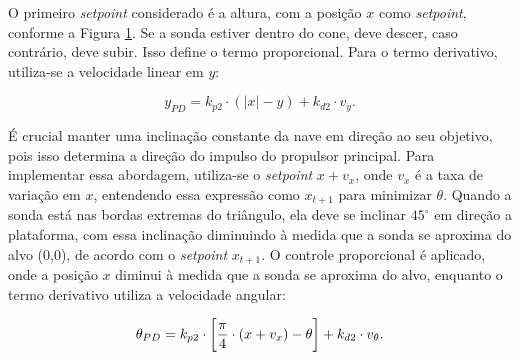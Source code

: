 \documentclass[12pt,           %
a4paper,                       %
openany,                       %
oneside,                       %
chapter=TITLE,                 %
english,                       %
spanish,                       %
brazil,                        %
sumario=tradicional]{abntex2}  %
\begin{document}
\begin{OnehalfSpace}
\begin{figure}[H]
    \label{fig:aa}
\end{figure}
\vspace*{-1cm}
{\raggedright {}}

O primeiro \textit{setpoint} considerado é a altura, com a posição $x$ como \textit{setpoint}, conforme a Figura \ref{fig:aa}. Se a sonda estiver dentro do cone, deve descer, caso contrário, deve subir. Isso define o termo proporcional. Para o termo derivativo, utiliza-se a velocidade linear em $y$:

\begin{equation}
    y_{PD} = k_{p2}\cdot (|x|-y)+k_{d2}\cdot v_y.
    \label{eq:ypd}
\end{equation}


É crucial manter uma inclinação constante da nave em direção ao seu objetivo, pois isso determina a direção do impulso do propulsor principal. Para implementar essa abordagem, utiliza-se o \textit{setpoint} $x + v_x$, onde $v_x$ é a taxa de variação em $x$, entendendo essa expressão como $x_{t+1}$ para minimizar $\theta$. Quando a sonda está nas bordas extremas do triângulo, ela deve se inclinar $ 45^\circ$ em direção a plataforma, com essa inclinação diminuindo à medida que a sonda se aproxima do alvo (0,0), de acordo com o \textit{setpoint} $x_{t+1}$. O controle proporcional é aplicado, onde a posição $x$ diminui à medida que a sonda se aproxima do alvo, enquanto o termo derivativo utiliza a velocidade angular:

\begin{equation}
    \theta_{PD} = k_{p2}\cdot \bigg{[} \frac{\pi}{4}\cdot (x+v_x)-\theta\bigg{]}+k_{d2}\cdot v_{\theta}.
    \label{eq:tpd}
\end{equation}


\end{OnehalfSpace}
\end{document}
